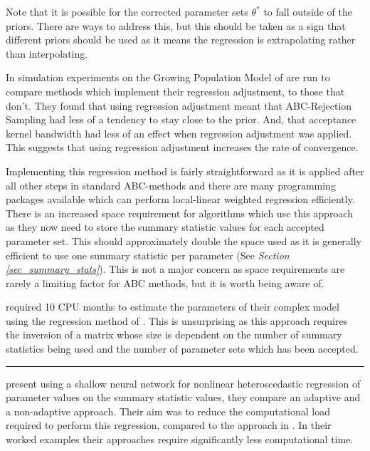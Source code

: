 \documentclass[11pt,a4paper]{article}
\theoremstyle{break}
\begin{document}
  Note that it is possible for the corrected parameter sets $\theta^*$ to fall outside of the priors. There are ways to address this, but this should be taken as a sign that different priors should be used as it means the regression is extrapolating rather than interpolating.

  \par In \cite[]{ABC_in_population_genetics} simulation experiments on the Growing Population Model of \cite[]{population_growth_of_human_Y_chromosomes} are run to compare methods which implement their regression adjustment, to those that don't. They found that using regression adjustment meant that ABC-Rejection Sampling had less of a tendency to stay close to the prior. And, that acceptance kernel bandwidth had less of an effect when regression adjustment was applied. This suggests that using regression adjustment increases the rate of convergence.

  \par Implementing this regression method is fairly straightforward as it is applied after all other steps in standard ABC-methods and there are many programming packages available which can perform local-linear weighted regression efficiently. There is an increased  space requirement for algorithms which use this approach as they now need to store the summary statistic values for each accepted parameter set. This should approximately double the space used as it is generally efficient to use one summary statistic per parameter (See \textit{Section \ref{sec_summary_stats}}). This is not a major concern as space requirements are rarely a limiting factor for ABC methods, but it is worth being aware of.

  \par \cite[]{statistical_evaluation_of_alternative_models_of_human_evolution} required 10 CPU months to estimate the parameters of their complex model using the regression method of \cite[]{ABC_in_population_genetics}. This is unsurprising as this approach requires the inversion of a matrix whose size is dependent on the number of summary statistics being used and the number of parameter sets which has been accepted.


  \begin{center}
    \noindent\rule{.8\textwidth}{0.4pt}
  \end{center}

  \par \cite[]{non_linear_regression_models_for_abc} present using a shallow neural network for nonlinear heteroscedastic regression of parameter values on the summary statistic values, they compare an adaptive and a non-adaptive approach. Their aim was to reduce the computational load required to perform this regression, compared to the approach in \cite[]{ABC_in_population_genetics}. In their worked examples their approaches require significantly less computational time.
\end{document}
